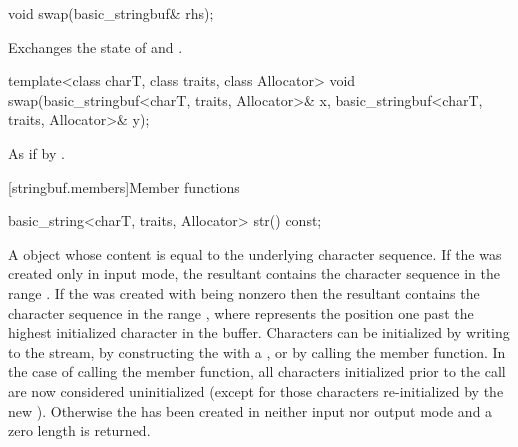 %
\begin{itemdecl}
void swap(basic_stringbuf& rhs);
\end{itemdecl}

\begin{itemdescr}
\pnum
\effects Exchanges the state of 
and .
\end{itemdescr}

%
\begin{itemdecl}
template<class charT, class traits, class Allocator>
  void swap(basic_stringbuf<charT, traits, Allocator>& x,
            basic_stringbuf<charT, traits, Allocator>& y);
\end{itemdecl}

\begin{itemdescr}
\pnum
\effects As if by .
\end{itemdescr}

[stringbuf.members]{Member functions}

%
\begin{itemdecl}
basic_string<charT, traits, Allocator> str() const;
\end{itemdecl}

\begin{itemdescr}
\pnum
\returns
A
object whose content is equal to the
underlying character sequence.
If the  was created only in input mode, the resultant
 contains the character sequence in the range
. If the  was created with
 being nonzero then the resultant 
contains the character sequence in the range , where
 represents the position one past the highest initialized character
in the buffer. Characters can be initialized by writing to the stream, by constructing
the  with a , or by calling the
 member function. In the case of calling the
 member function, all characters initialized prior to
the call are now considered uninitialized (except for those characters re-initialized
by the new ). Otherwise the  has been created
in neither input nor output mode and a zero length  is returned.
\end{itemdescr}


